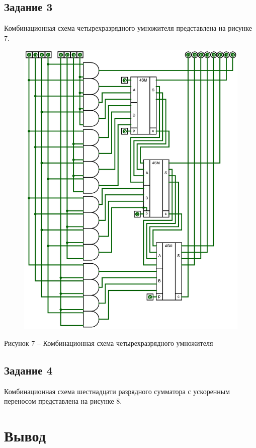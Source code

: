 \documentclass[a4paper,14pt]{extarticle}
\begin{document}
	\subsection*{Задание 3}
	Комбинационная схема четырехразрядного умножителя представлена на рисунке 7.
	\begin{figure}[h]
		\centering
		\includegraphics[width=0.9\linewidth]{images/s-3}
	\end{figure}
	\begin{center}
		Рисунок 7 – Комбинационная схема четырехразрядного умножителя
	\end{center}
	
	\pagebreak
	\subsection*{Задание 4}
	Комбинационная схема шестнадцати разрядного сумматора с ускоренным переносом представлена на рисунке 8.
	
	\section*{Вывод}
	
\end{document}
